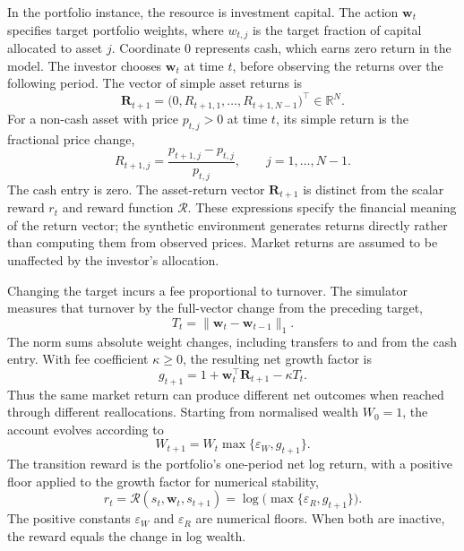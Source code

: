 \documentclass[10pt]{article}
\newcommand{\R}{\mathbb{R}}
\begin{document}
In the portfolio instance, the resource is investment capital. The action $\bm w_t$ specifies target portfolio weights, where $w_{t,j}$ is the target fraction of capital allocated to asset $j$. Coordinate $0$ represents cash, which earns zero return in the model. The investor chooses $\bm w_t$ at time $t$, before observing the returns over the following period. The vector of simple asset returns is
\begin{equation}
  \bm R_{t+1}
    =\bigl(0,R_{t+1,1},\ldots,R_{t+1,N-1}\bigr)^\top
    \in\R^N.
  \label{eq:asset-return-vector}
\end{equation}
For a non-cash asset with price $p_{t,j}>0$ at time $t$, its simple return is the fractional price change,
\begin{equation}
  R_{t+1,j}
    =\frac{p_{t+1,j}-p_{t,j}}{p_{t,j}},
  \qquad j=1,\ldots,N-1.
  \label{eq:asset-simple-return}
\end{equation}
The cash entry is zero. The asset-return vector $\bm R_{t+1}$ is distinct from the scalar reward $r_t$ and reward function $\mathcal R$. These expressions specify the financial meaning of the return vector; the synthetic environment generates returns directly rather than computing them from observed prices. Market returns are assumed to be unaffected by the investor's allocation.

Changing the target incurs a fee proportional to turnover. The simulator measures that turnover by the full-vector change from the preceding target,
\begin{equation}
  T_t=\lVert\bm w_t-\bm w_{t-1}\rVert_1.
  \label{eq:portfolio-turnover}
\end{equation}
The norm sums absolute weight changes, including transfers to and from the cash entry. With fee coefficient $\kappa\geq0$, the resulting net growth factor is
\begin{equation}
  g_{t+1}=1+\bm w_t^\top\bm R_{t+1}-\kappa T_t.
  \label{eq:portfolio-net-growth}
\end{equation}
Thus the same market return can produce different net outcomes when reached through different reallocations. Starting from normalised wealth $W_0=1$, the account evolves according to
\begin{equation}
  W_{t+1}=W_t\max\{\varepsilon_W,g_{t+1}\}.
  \label{eq:portfolio-wealth}
\end{equation}
The transition reward is the portfolio’s one-period net log return, with a positive floor applied to the growth factor for numerical stability,
\begin{equation}
  r_t=\mathcal R(s_t,\bm w_t,s_{t+1})
     =\log\!\bigl(\max\{\varepsilon_R,g_{t+1}\}\bigr).
  \label{eq:portfolio-reward}
\end{equation}
The positive constants $\varepsilon_W$ and $\varepsilon_R$ are numerical floors. When both are inactive, the reward equals the change in log wealth.
\end{document}
